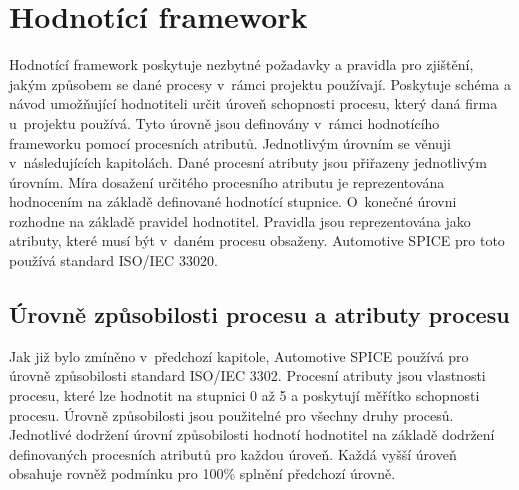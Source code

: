 \documentclass[czech,master]{diploma}
\begin{document}









\section{Hodnotící framework}
Hodnotící framework poskytuje nezbytné požadavky a pravidla pro zjištění, jakým způsobem se dané procesy v~rámci projektu používají. Poskytuje schéma a návod umožňující hodnotiteli určit úroveň schopnosti procesu, který daná firma u~projektu používá. Tyto úrovně jsou definovány v~rámci hodnotícího frameworku pomocí procesních atributů. Jednotlivým úrovním se věnuji v~následujících kapitolách. Dané procesní atributy jsou přiřazeny jednotlivým úrovním. Míra dosažení určitého procesního atributu je reprezentována hodnocením na základě definované hodnotící stupnice. O~konečné úrovni rozhodne na základě pravidel hodnotitel. Pravidla jsou reprezentována jako atributy, které musí být v~daném procesu obsaženy. Automotive SPICE pro toto používá standard ISO/IEC 33020. \cite{ref:aspice_download_1523}

\subsection{Úrovně způsobilosti procesu a atributy procesu}
Jak již bylo zmíněno v~předchozí kapitole, Automotive SPICE používá pro úrovně způsobilosti standard ISO/IEC 3302. Procesní atributy jsou vlastnosti procesu, které lze hodnotit na stupnici 0 až 5 a poskytují měřítko schopnosti procesu. Úrovně způsobilosti jsou použitelné pro všechny druhy procesů. Jednotlivé dodržení úrovní způsobilosti hodnotí hodnotitel na základě dodržení definovaných procesních atributů pro každou úroveň. Každá vyšší úroveň obsahuje rovněž podmínku pro 100\% splnění předchozí úrovně.
\end{document}
